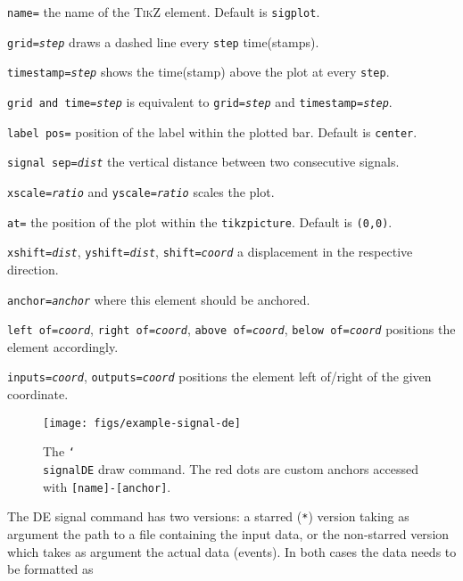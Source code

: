 \begin{optionslist}
\item \texttt{name=} the name of the \textsc{TikZ} element. Default is \texttt{sigplot}.
\item \texttt{grid=\it step} draws a dashed line every \texttt{step} time(stamps).
\item \texttt{timestamp=\it step} shows the time(stamp) above the plot at every \texttt{step}.
\item \texttt{grid and time=\it step} is equivalent to \texttt{grid=\it step} and \texttt{timestamp=\it step}.
\item \texttt{label pos=} position of the label within the plotted bar. Default is \texttt{center}.
\item \texttt{signal sep=\it dist} the vertical distance between two consecutive signals.
\item \texttt{xscale=\it ratio} and \texttt{yscale=\it ratio} scales the plot.
\item \texttt{at=} the position of the plot within the \texttt{tikzpicture}. Default is \texttt{(0,0)}.
\item \texttt{xshift=\it dist}, \texttt{yshift=\it dist}, \texttt{shift=\it coord} a displacement in the respective direction.
\item \texttt{anchor=\it anchor} where this element should be anchored.
\item \texttt{left of=\it coord}, \texttt{right of=\it coord}, \texttt{above of=\it coord}, \texttt{below of=\it coord} positions the element accordingly.
\item \texttt{inputs=\it coord}, \texttt{outputs=\it coord} positions the element left of/right of the given coordinate.
\end{optionslist}

\begin{figure}[htb]\centering
\texttt{[image: figs/example-signal-de]}

\caption{The \texttt{\char`\\signalDE} draw command. The red dots are custom anchors accessed with \texttt{[name]-[anchor]}.}
\end{figure}
\hspace{1pt}

\noindent The DE signal command has two versions: a starred (\texttt{*}) version taking as argument the path to a file containing the input data, or the non-starred version which takes as argument the actual data (events). In both cases the data needs to be formatted as

